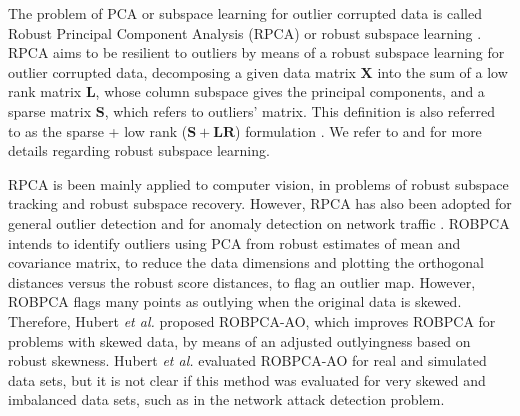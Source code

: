 The problem of PCA or subspace learning for outlier corrupted data is called Robust Principal Component Analysis (RPCA) or robust subspace learning \cite{candes2011robust, vaswani2018robust}. RPCA aims to be resilient to outliers by means of a robust subspace learning \cite{vaswani2018robust} for outlier corrupted data, decomposing a given data matrix $\pmb{X}$ into the sum of a low rank matrix $\pmb{L}$, whose column subspace gives the principal components, and a sparse matrix $\pmb{S}$, which refers to outliers’ matrix. This definition is also referred to as the sparse + low rank ($\pmb{S + LR}$) formulation \cite{vaswani2018robust}. We refer to \cite{lerman2018overview} and \cite{vaswani2018robust} for more details regarding robust subspace learning.

RPCA is been mainly applied to computer vision, in problems of robust subspace tracking and robust subspace recovery. However, RPCA has also been adopted for general outlier detection \cite{hubert2005robpca,hubert2009robustskewed,cherapanamjeri2017thresholding,zhou2017anomaly,NetflixSurus} and for anomaly detection on network traffic \cite{pascoal2012robust}. ROBPCA \cite{hubert2005robpca} intends to identify outliers using PCA from robust estimates of mean and covariance matrix, to reduce the data dimensions and plotting the orthogonal distances versus the robust score distances, to flag an outlier map. However, ROBPCA flags many points as outlying when the original data is skewed. Therefore, Hubert \emph{et al.} \cite{hubert2009robustskewed} proposed ROBPCA-AO, which improves ROBPCA for problems with skewed data, by means of an adjusted outlyingness based on robust skewness. Hubert \emph{et al.} \cite{hubert2009robustskewed} evaluated ROBPCA-AO for real and simulated data sets, but it is not clear if this method was evaluated for very skewed and imbalanced data sets, such as in the network attack detection problem.

